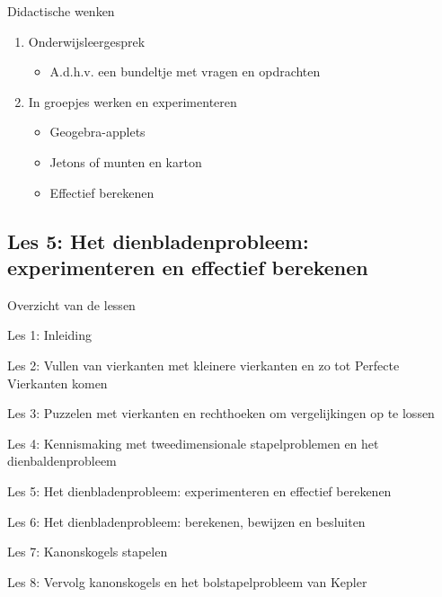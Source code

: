 \documentclass[dutch]{beamer}
\begin{document}
\begin{frame}{Didactische wenken}

\begin{enumerate}
	\item Onderwijsleergesprek
	\begin{itemize}
	\item A.d.h.v. een bundeltje met vragen en opdrachten
\end{itemize}
	
	\item In groepjes werken en experimenteren	
	\begin{itemize}
	\item Geogebra-applets
	\item Jetons of munten en karton
	\item Effectief berekenen
\end{itemize}
\end{enumerate}
\end{frame}






\subsection{Les 5: Het dienbladenprobleem: experimenteren en effectief berekenen}
\begin{frame}
{Overzicht van de lessen}
\begin{list}{\quad}{}
\item Les 1: Inleiding
\item Les 2: Vullen van vierkanten met kleinere vierkanten en zo tot Perfecte Vierkanten komen
\item Les 3: Puzzelen met vierkanten en rechthoeken om vergelijkingen op te lossen
\item Les 4: Kennismaking met tweedimensionale stapelproblemen en het dienbaldenprobleem 
\item {\color{blue}Les 5: Het dienbladenprobleem: experimenteren en effectief berekenen}
\item Les 6: Het dienbladenprobleem: berekenen, bewijzen en besluiten
\item Les 7: Kanonskogels stapelen
\item Les 8: Vervolg kanonskogels en het bolstapelprobleem van Kepler
\end{list}
\end{frame}
\end{document}
